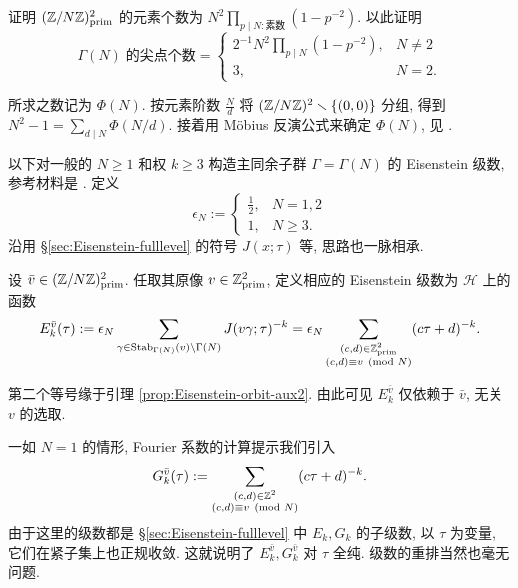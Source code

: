 \begin{exercise}\label{exo:count-GammaN-cusps}
	证明 $(\mathbb{Z}/N\mathbb{Z})^2_{\mathrm{prim}}$ 的元素个数为 $N^2 \prod_{p \mid N: \text{素数}} \left( 1 - p^{-2} \right)$. 以此证明
	\[ \Gamma(N) \;\text{的尖点个数} = \begin{cases}
		2^{-1} N^2 \prod_{p \mid N} \left( 1 - p^{-2} \right), & N \neq 2 \\
		3, & N = 2.
	\end{cases}\]
	\begin{hint}
		所求之数记为 $\Phi(N)$. 按元素阶数 $\frac{N}{d}$ 将 $(\mathbb{Z}/N\mathbb{Z})^2 \smallsetminus \{(0,0)\}$ 分组, 得到 $N^2 - 1 = \sum_{d \mid N} \Phi(N/d)$. 接着用 Möbius 反演公式来确定 $\Phi(N)$, 见 \cite[\S 5.4]{Li1}.
	\end{hint}
\end{exercise}

以下对一般的 $N \geq 1$ 和权 $k \geq 3$ 构造主同余子群 $\Gamma = \Gamma(N)$ 的 Eisenstein 级数, 参考材料是 \cite[\S 4.2]{DS05}. 定义
\[ \epsilon_N := \begin{cases} \frac{1}{2}, & N=1,2 \\ 1, & N \geq 3. \end{cases} \]
沿用 \S\ref{sec:Eisenstein-fulllevel} 的符号 $J(x;\tau)$ 等, 思路也一脉相承.

  
\begin{definition}\label{def:Eisenstein-GammaN}
	设 $\bar{v} \in (\mathbb{Z}/N\mathbb{Z})^2_{\mathrm{prim}}$. 任取其原像 $v \in \mathbb{Z}^2_{\mathrm{prim}}$, 定义相应的 Eisenstein 级数为 $\mathcal{H}$ 上的函数
	\begin{equation*}
		E^{\bar{v}}_k(\tau) := \epsilon_N \sum_{ \gamma \in \operatorname{Stab}_{\Gamma(N)}(v) \backslash \Gamma(N) } J(v\gamma; \tau)^{-k} \\
		= \epsilon_N \sum_{\substack{ (c,d) \in \mathbb{Z}^2_{\mathrm{prim}} \\ (c,d) \equiv v \pmod{N} }} (c\tau + d)^{-k}.
	\end{equation*}
\end{definition}
第二个等号缘于引理 \ref{prop:Eisenstein-orbit-aux2}. 由此可见 $E^{\bar{v}}_k$ 仅依赖于 $\bar{v}$, 无关 $v$ 的选取.

一如 $N = 1$ 的情形, Fourier 系数的计算提示我们引入
\begin{equation}\label{eqn:G-Gamma0N}
	G^{\bar{v}}_k(\tau) := \sum_{\substack{ (c,d) \in \mathbb{Z}^2 \\ (c,d) \equiv v \pmod{N} }} (c\tau + d)^{-k}.
\end{equation}
由于这里的级数都是 \S\ref{sec:Eisenstein-fulllevel} 中 $E_k, G_k$ 的子级数, 以 $\tau$ 为变量, 它们在紧子集上也正规收敛. 这就说明了 $E^{\bar{v}}_k, G^{\bar{v}}_k$ 对 $\tau$ 全纯. 级数的重排当然也毫无问题.

